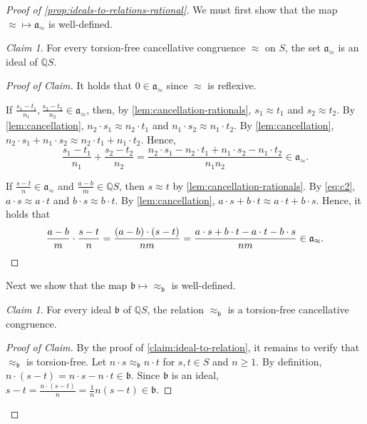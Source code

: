 \documentclass[11pt]{scrartcl}
\theoremstyle{definition}
\theoremstyle{plain}
\theoremstyle{remark}
\newtheorem{claim}[definition]{Claim}
\newenvironment{claimproof}[1][Proof of Claim]{\begin{proof}[#1] \renewcommand{\qedsymbol}{$\lrcorner$}}{ \end{proof}}
\begin{document}
	\begin{proof}[Proof of \cref{prop:ideals-to-relations-rational}]
		We must first show that the map  ${\approx} \mapsto \mathfrak{a}_{\approx }$ is well-defined.
		\begin{claim}
			For every torsion-free cancellative congruence $\approx$ on $S$,
			the set $\mathfrak{a}_{\approx}$ is an ideal of $\mathbb{Q}S$.
		\end{claim}
		\begin{claimproof}
			It holds that $0 \in \mathfrak{a}_{\approx}$ since $\approx$ is reflexive. 

			If $\frac{s_1 - t_1}{n_1},\frac{s_2 - t_2}{n_2} \in \mathfrak{a}_{\approx}$,
			then, by \cref{lem:cancellation-rationals}, 
			$s_1 \approx t_1$ and $s_2 \approx t_2$.
			By \cref{lem:cancellation},
			$n_2 \cdot s_1 \approx n_2 \cdot t_1$
			and $n_1 \cdot s_2 \approx n_1 \cdot t_2$.
			By \cref{lem:cancellation},
			$n_2 \cdot s_1 + n_1 \cdot s_2 \approx n_2 \cdot t_1 + n_1\cdot t_2$.
			Hence, 
			\[
			\frac{s_1 - t_1}{n_1} + \frac{s_2 - t_2}{n_2}
			= \frac{n_2 \cdot s_1 - n_2 \cdot t_1 + n_1 \cdot s_2 - n_1 \cdot t_2}{n_1n_2}
			\in \mathfrak{a}_{\approx}.
			\]

			If $\frac{s - t}{n} \in \mathfrak{a}_{\approx}$
			and $\frac{a - b}{m} \in \mathbb{Q}S$,
			then $s \approx t$ by \cref{lem:cancellation-rationals}.
			By \eqref{eq:c2},
			$a \cdot s \approx a \cdot t$
			and 
			$b \cdot s \approx b \cdot t$.
			By \cref{lem:cancellation},
			\(
			a\cdot s + b \cdot t \approx a \cdot t + b \cdot s.
			\)
			Hence, it holds that
			\[
			\frac{a - b}{m} \cdot 
			\frac{s - t}{n} =
			\frac{(a-b)\cdot (s - t)}{nm}
			=
			\frac{a \cdot s + b \cdot t - a \cdot t - b \cdot s}{nm}
			\in \mathfrak{a}_{\approx}. \qedhere
			\]\end{claimproof}

		Next we show that the map  $\mathfrak{b} \mapsto {\approx_{\mathfrak{b}}}$ is well-defined.
		
		\begin{claim}\label{claim:ideal-to-relation-rational}
			For every ideal $\mathfrak{b}$ of $\mathbb{Q}S$,
			the relation $\approx_{\mathfrak{b}}$ is a torsion-free cancellative congruence.
		\end{claim}
		\begin{claimproof}
			By the proof of \cref{claim:ideal-to-relation},
			it remains to verify that $\approx_{\mathfrak{b}}$ is torsion-free.
			Let $n \cdot s \approx_{\mathfrak{b}} n \cdot t$
			for $s, t\in S$ and $n \geq 1$.
			By definition, 
			$n \cdot (s - t) = n \cdot s - n \cdot t \in \mathfrak{b}$.
			Since $\mathfrak{b}$ is an ideal,
			$s - t = \frac{n \cdot (s-t)}n = \frac1n n (s-t) \in \mathfrak{b}$.
		\end{claimproof}



\end{proof}
\end{document}
